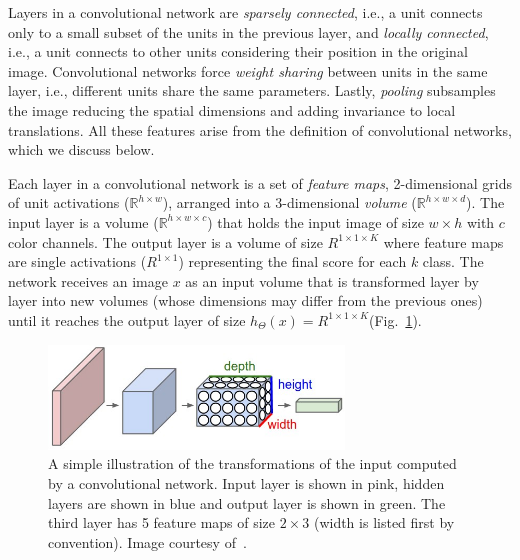 Layers in a convolutional network are \emph{sparsely connected}, i.e., a unit connects only to a small subset of the units in the previous layer, and \emph{locally connected}, i.e., a unit connects to other units considering their position in the original image. Convolutional networks force \emph{weight sharing} between units in the same layer, i.e., different units share the same parameters. Lastly, \emph{pooling} subsamples the image reducing the spatial dimensions and adding invariance to local translations. All these features arise from the definition of convolutional networks, which we discuss below.

Each layer in a convolutional network is a set of \emph{feature maps}, 2-dimensional grids of unit activations ($\mathbb{R}^{h\times w}$), arranged into a 3-dimensional \emph{volume} ($\mathbb{R}^{h\times w \times d}$).
The input layer is a volume ($\mathbb{R}^{h\times w \times c}$) that holds the input image of size $w\times h$ with $c$ color channels. The output layer is a volume of size $R^{1\times 1 \times K}$ where feature maps are single activations ($R^{1\times 1}$) representing the final score for each $k$ class. The network receives an image $x$ as an input volume that is transformed layer by layer into new volumes (whose dimensions may differ from the previous ones) until it reaches the output layer of size $h_\Theta(x) = R^{1\times 1 \times K}$(Fig.~\ref{fig:ConvNetVolumes}).

\begin{figure}[h]
	\centering
	\includegraphics[width = 0.7\textwidth]{plots/convNetVolumes.jpeg}
	\caption[Illustration of a convolutional network]{A simple illustration of the transformations of the input computed by a convolutional network. Input layer is shown in pink, hidden layers are shown in blue and output layer is shown in green. The third layer has 5 feature maps of size $2\times3$ (width is listed first by convention). Image courtesy of~\cite{Karpathy2015}.}
	\label{fig:ConvNetVolumes}
\end{figure}

